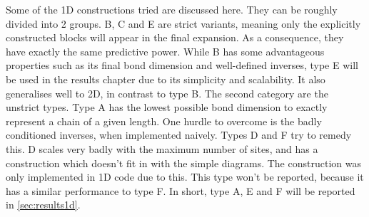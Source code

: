 Some of the 1D constructions tried are discussed here. They can be roughly divided into 2 groups. B, C and E are strict variants, meaning only the explicitly constructed blocks will appear in the final expansion. As a consequence, they have exactly the same predictive power. While B has some advantageous properties such as its final bond dimension and well-defined inverses, type E will be used in the results chapter due to its simplicity and scalability. It also generalises well to 2D, in contrast to type B.
The second category are the unstrict types. Type A has the lowest possible bond dimension to exactly represent a chain of a given length. One hurdle to overcome is the badly conditioned inverses, when implemented naively. Types D and F try to remedy this. D scales very badly with the maximum number of sites, and has a construction which doesn't fit in with the simple diagrams. The construction was only implemented in 1D code due to this. This type won't be reported, because it has  a similar performance to type F.
In short, type A, E and F will be reported in \cref{sec:results1d}.